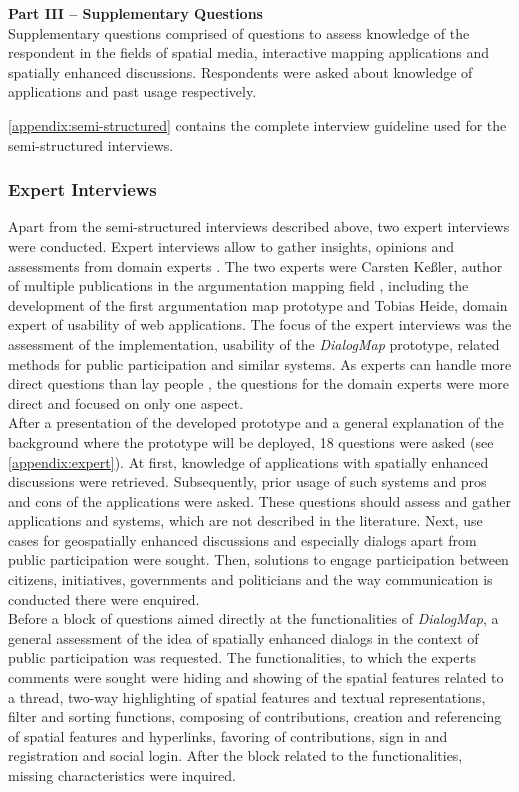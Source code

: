 \textbf{Part III -- Supplementary Questions}\\
Supplementary questions comprised of questions to assess knowledge of the respondent in the fields of spatial media, interactive mapping applications and spatially enhanced discussions. Respondents were asked about knowledge of applications and past usage respectively.

\ref{appendix:semi-structured} contains the complete interview guideline used for the semi-structured interviews.

\subsubsection{Expert Interviews}
Apart from the semi-structured interviews described above, two expert interviews were conducted. Expert interviews allow to gather insights, opinions and assessments from domain experts \cite{hopf20045}. The two experts were Carsten Ke{\ss}ler, author of multiple publications in the argumentation mapping field \cite{Kessler2005_ArgumentationMapPrototype,kessler_argumap,Kessler2005_Conflict_Resolution}, including the development of the first argumentation map prototype and Tobias Heide, domain expert of usability of web applications. The focus of the expert interviews was the assessment of the implementation, usability of the \textit{DialogMap} prototype, related methods for public participation and similar systems. As experts can handle more direct questions than lay people \cite{helfferich2005}, the questions for the domain experts were more direct and focused on only one aspect.\\
After a presentation of the developed prototype and a general explanation of the background where the prototype will be deployed, 18 questions were asked (see \ref{appendix:expert}). At first, knowledge of applications with spatially enhanced discussions were retrieved. Subsequently, prior usage of such systems and pros and cons of the applications were asked. These questions should assess and gather applications and systems, which are not described in the literature. Next, use cases for geospatially enhanced discussions and especially dialogs apart from public participation were sought. Then, solutions to engage participation between citizens, initiatives, governments and politicians and the way communication is conducted there were enquired.\\
Before a block of questions aimed directly at the functionalities of \textit{DialogMap}, a general assessment of the idea of spatially enhanced dialogs in the context of public participation was requested. The functionalities, to which the experts comments were sought were hiding and showing of the spatial features related to a thread, two-way highlighting of spatial features and textual representations, filter and sorting functions, composing of contributions, creation and referencing of spatial features and hyperlinks, favoring of contributions, sign in and registration and social login. After the block related to the functionalities, missing characteristics were inquired.\\
